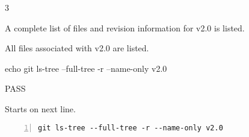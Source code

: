 \begin{description}[align=right,leftmargin=3.2cm,labelindent=3.0cm]
\item[Step:] 3
\item[Confirm:] A complete list of files and revision information for v2.0 is listed.
\item[Expectation:] All files associated with v2.0 are listed.
\item[Command:] echo git  ls-tree --full-tree -r --name-only v2.0
\item[Test Result:] PASS
\item[Evidence:] Starts on next line.
\end{description}
\begin{lstlisting}[numbers=left]
git ls-tree --full-tree -r --name-only v2.0

\end{lstlisting}
